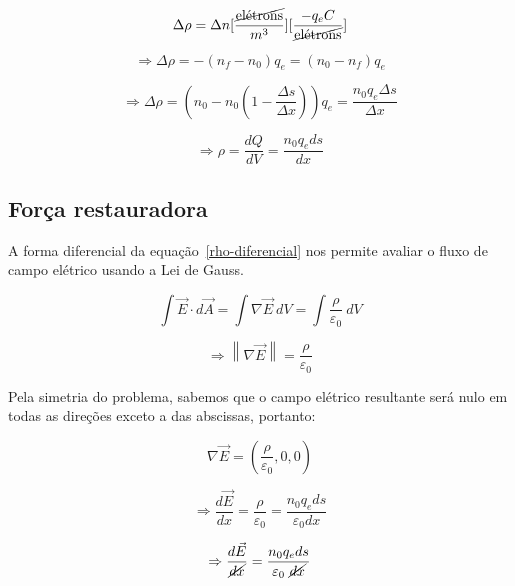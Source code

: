 \documentclass[
	article,
	11pt,
	oneside,
	a4paper,
	english,
	brazil,
	sumario=tradicional
	]{abntex2}
\newcommand{\norm}[1]{\left\lVert#1\right\rVert}
\begin{document}
\begin{equation}
  \Delta\rho = \Delta n [\frac{\cancel{\textrm{elétrons}}}{m^3}][\frac{- q_e C}{\cancel{\textrm{elétrons}}}]
\end{equation}

\begin{equation}
  \Rightarrow \Delta\rho = - (n_f - n_0) q_e = (n_0 - n_f) q_e
\end{equation}

\begin{equation}
  \Rightarrow \Delta\rho = (n_0 - n_0(1 - \frac{\Delta s}{\Delta x}))q_e = \frac{n_0 q_e \Delta s}{\Delta x}
\end{equation}

\begin{equation} \label{rho-diferencial}
  \Rightarrow \rho = \frac{dQ}{dV} = \frac{n_0 q_e ds}{dx}
\end{equation}

\subsection{Força restauradora}

A forma diferencial da equação~\ref{rho-diferencial} nos permite avaliar o fluxo de campo elétrico usando a Lei de Gauss.

\begin{equation}
  \int \vec{E} \cdot d\vec{A} = \int \nabla \vec{E}~dV = \int \frac{\rho}{\varepsilon _0}~dV
\end{equation}

\begin{equation}
  \Rightarrow  \norm{\nabla \vec{E}} = \frac{\rho}{\varepsilon _0}
\end{equation}

Pela simetria do problema, sabemos que o campo elétrico resultante será nulo em todas as direções exceto a das abscissas, portanto:

\begin{equation}
  \nabla \vec{E} = (\frac{\rho}{\varepsilon _0}, 0, 0)
\end{equation}

\begin{equation}
  \Rightarrow \frac{d\vec{E}}{dx} = \frac{\rho}{\varepsilon _0} = \frac{n_0 q_e ds}{\varepsilon _0 dx}
\end{equation}

\begin{equation}
  \Rightarrow \frac{d\vec{E}}{\cancel{dx}} = \frac{n_0 q_e ds}{\varepsilon _0~\cancel{dx}}
\end{equation}
\end{document}
